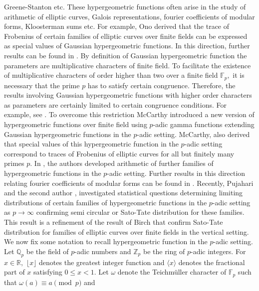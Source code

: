 \documentclass[12pt]{amsart}
\theoremstyle{plain}
\theoremstyle{definition}
\theoremstyle{remark}
\newcommand{\Z}{\mathbb{Z}}
\newcommand{\Q}{\mathbb{Q}}
\newcommand{\F}{\mathbb{F}}
\newcommand{\R}{\mathbb{R}}
\numberwithin{equation}{section}
\begin{document}
{	Greene-Stanton} etc. These hypergeometric functions often arise in the study of arithmetic of elliptic curves, Galois representations, fourier coefficients of modular forms, Kloosterman sums etc. For example, Ono \cite{ono} derived that the trace of Frobenius of certain families of elliptic curves over finite fields can be expressed as special values of Gaussian hypergeometric functions. In this direction, further results can be found in \cite{ahlgren-ono, AO, B-K, fop, Fuselier, FuselierHecke, Lennon1, Lennon, Long, MP, Rouse, TY}. By definition of Gaussian hypergeometric function the parameters are multiplicative characters of finite field. To facilitate the existence of multiplicative characters of order higher than two over a finite field $\F_p,$ it is necessary that the prime $p$ has to satisfy certain congruence. Therefore, the results involving Gaussian hypergeometric functions with higher order characters as parameters are certainly limited to certain congruence conditions.  For example, see \cite{Fuselier, FuselierHecke, Lennon1, Lennon}. To overcome this restriction McCarthy \cite{McCarthyPJM} introduced a new version of hypergeometric functions over finite field using $p$-adic gamma functions extending Gaussian hypergeometric functions in the $p$-adic setting. McCarthy, also derived that special values of this hypergeometric function in the $p$-adic setting correspond to traces of Frobenius of elliptic curves for all but finitely many primes $p.$ In \cite{BS, BS1, BSM, Barman-Sul2}, the authors developed arithmetic of further families of hypergeometric functions in the $p$-adic setting. Further results in this direction relating fourier coefficients of modular forms can be found in \cite{FM, Pujahari-Saikia, Barman-Sul}. Recently, Pujahari and the second author \cite{Pujahari-Saikia2}, investigated statistical questions determining limiting distributions of certain families of hypergeometric functions in the $p$-adic setting as $p\rightarrow\infty$ confirming semi circular or Sato-Tate distribution for these families. This result is a refinement of the result of Birch \cite{Birch} that confirm Sato-Tate distribution for families of elliptic curves over finite fields in the vertical setting. We now fix some notation to recall hypergeometric function in the $p$-adic setting. Let $\Q_p$ be the field of $p$-adic numbers and $\Z_p$ be the ring of $p$-adic integers. For $x\in\R,$ $\lfloor x \rfloor$ denotes the greatest integer function and $\langle x\rangle$ denotes the fractional part of $x$ satisfying $0\leq x<1.$ Let $\omega$ denote the Teichm\"{u}ller character of $\F_p$ such that $\omega (a)\equiv a\pmod{p}$ and 
\end{document}
